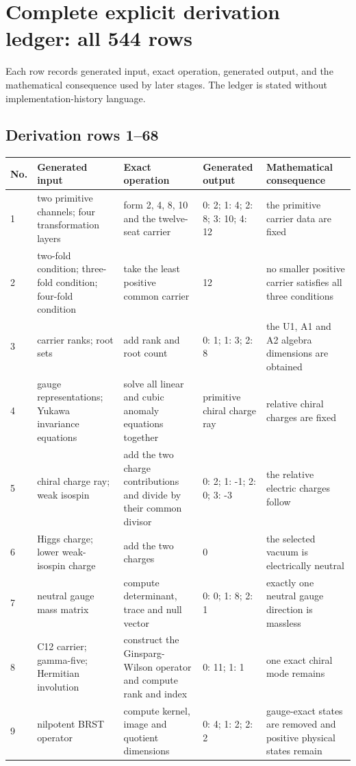 \documentclass[11pt]{article}
\numberwithin{equation}{section}
\theoremstyle{remark}
\begin{document}
\section{Complete explicit derivation ledger: all 544 rows}
\label{supp:derivations}
Each row records generated input, exact operation, generated output, and the mathematical consequence used by later stages. The ledger is stated without implementation-history language.
\begin{landscape}
\small
\subsection{Derivation rows 1--68}
\begin{longtable}{p{0.65cm}p{3.5cm}p{4.0cm}p{4.0cm}p{4.6cm}}
\toprule No.&Generated input&Exact operation&Generated output&Mathematical consequence\\\midrule\endhead
1&two primitive channels; four transformation layers&form 2, 4, 8, 10 and the twelve-seat carrier&0: 2; 1: 4; 2: 8; 3: 10; 4: 12&the primitive carrier data are fixed\\
2&two-fold condition; three-fold condition; four-fold condition&take the least positive common carrier&12&no smaller positive carrier satisfies all three conditions\\
3&carrier ranks; root sets&add rank and root count&0: 1; 1: 3; 2: 8&the U1, A1 and A2 algebra dimensions are obtained\\
4&gauge representations; Yukawa invariance equations&solve all linear and cubic anomaly equations together&primitive chiral charge ray&relative chiral charges are fixed\\
5&chiral charge ray; weak isospin&add the two charge contributions and divide by their common divisor&0: 2; 1: -1; 2: 0; 3: -3&the relative electric charges follow\\
6&Higgs charge; lower weak-isospin charge&add the two charges&0&the selected vacuum is electrically neutral\\
7&neutral gauge mass matrix&compute determinant, trace and null vector&0: 0; 1: 8; 2: 1&exactly one neutral gauge direction is massless\\
8&C12 carrier; gamma-five; Hermitian involution&construct the Ginsparg-Wilson operator and compute rank and index&0: 11; 1: 1&one exact chiral mode remains\\
9&nilpotent BRST operator&compute kernel, image and quotient dimensions&0: 4; 1: 2; 2: 2&gauge-exact states are removed and positive physical states remain\\

\end{longtable}
\end{landscape}
\end{document}
